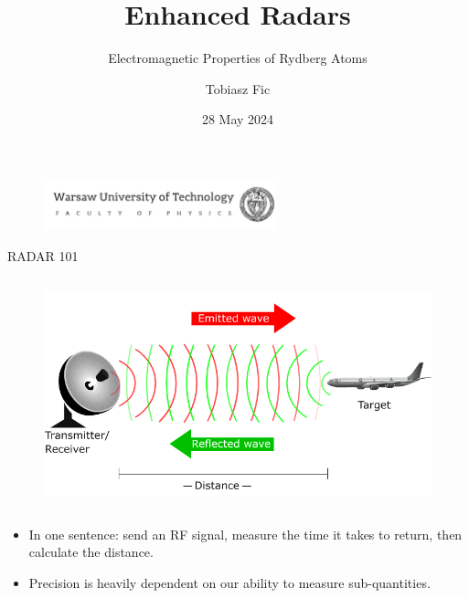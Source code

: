 

\title{Enhanced Radars}
    \subtitle{Electromagnetic Properties of Rydberg Atoms}
\author{Tobiasz Fic}
\date{28 May 2024}



\begin{frame}
    \maketitle
    \begin{figure}
        \centering
        \includegraphics[width=0.6\textwidth]{images/logo_eng.png}
    \end{figure}
\end{frame}

\begin{columnframe}{RADAR 101}
    \begin{column}{0.5\textwidth}
        \begin{figure}
            \centering
            \includegraphics[width=\textwidth]{images/radar_demo.png}
        \end{figure}
    \end{column}
    \begin{column}{0.5\textwidth}
        \begin{itemize}
            \item In one sentence: send an RF signal, measure the time it takes to return, then calculate the distance.
            \item Precision is heavily dependent on our ability to measure sub-quantities.
        \end{itemize}
    \end{column}
\end{columnframe}

